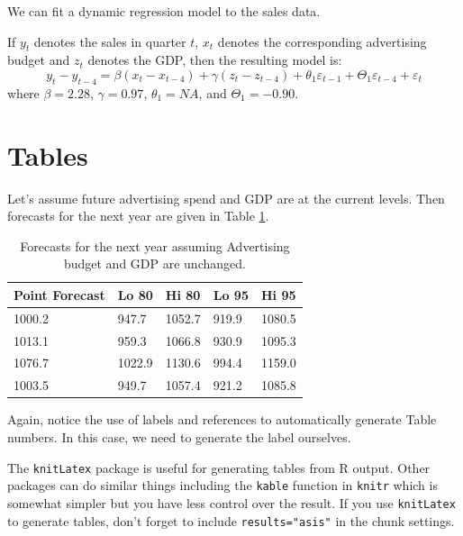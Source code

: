 \documentclass{aucklandthesis}
\begin{document}
We can fit a dynamic regression model to the sales data.

If \(y_t\) denotes the sales in quarter \(t\), \(x_t\) denotes the corresponding advertising budget and \(z_t\) denotes the GDP, then the resulting model is:
\begin{equation}
  y_t - y_{t-4} = \beta (x_t-x_{t-4}) + \gamma (z_t-z_{t-4}) + \theta_1 \varepsilon_{t-1} + \Theta_1 \varepsilon_{t-4} + \varepsilon_t
\end{equation}
where
\(\beta = 2.28\),
\(\gamma = 0.97\),
\(\theta_1 = NA\),
and
\(\Theta_1 = -0.90\).

\hypertarget{tables}{%
\section{Tables}\label{tables}}

Let's assume future advertising spend and GDP are at the current levels. Then forecasts for the next year are given in Table \ref{tab:salesforecasts}.

\begin{table}[ht]
\begin{center}
\begin{tabular}{lllll}
\toprule
Point Forecast & Lo 80 & Hi 80 & Lo 95 & Hi 95 \\
\midrule
1000.2 &  947.7 & 1052.7 & 919.9 & 1080.5 \\
1013.1 &  959.3 & 1066.8 & 930.9 & 1095.3 \\
1076.7 & 1022.9 & 1130.6 & 994.4 & 1159.0 \\
1003.5 &  949.7 & 1057.4 & 921.2 & 1085.8 \\
\bottomrule
\end{tabular}
\caption{Forecasts for the next year assuming Advertising budget and GDP are unchanged.}
\label{tab:salesforecasts}
\end{center}
\end{table}

Again, notice the use of labels and references to automatically generate Table numbers. In this case, we need to generate the label ourselves.

The \texttt{knitLatex} package is useful for generating tables from R output. Other packages can do similar things including the \texttt{kable} function in \texttt{knitr} which is somewhat simpler but you have less control over the result. If you use \texttt{knitLatex} to generate tables, don't forget to include \texttt{results="asis"} in the chunk settings.
\end{document}
